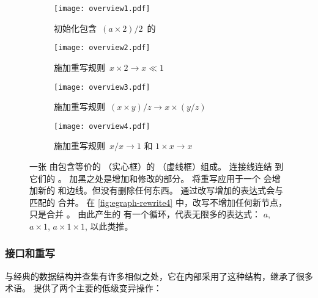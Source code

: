 \begin{figure}
  \begin{subfigure}[t]{0.175\linewidth}
    \centering
    \texttt{[image: overview1.pdf]}
    \caption{初始化包含\, ${(a \times 2) / 2}$ \,的\, \egraph}
    \label{fig:egraph-rewrite1}
  \end{subfigure}
  \hfill
  \begin{subfigure}[t]{0.23\linewidth}
    \centering
    \texttt{[image: overview2.pdf]}
    \caption{
      施加重写规则\, ${x \times 2 \to x \ll 1}$
    }
    \label{fig:egraph-rewrite2}
  \end{subfigure}
  \hfill
  \begin{subfigure}[t]{0.23\linewidth}
    \centering
    \texttt{[image: overview3.pdf]}
    \caption{
      施加重写规则\, ${(x \times y) / z \to x \times (y / z)}$
    }
    \label{fig:egraph-rewrite3}
  \end{subfigure}
  \hfill
  \begin{subfigure}[t]{0.24\linewidth}
    \centering
    \texttt{[image: overview4.pdf]}
    \caption{
      施加重写规则\, ${x / x \to 1}$ 和 ${1 \times x \to x}$
    }
    \label{fig:egraph-rewrite4}
  \end{subfigure}
  \caption{
    一张 \egraph 由包含等价的 \enodes（实心框）的 \eclasses （虚线框）组成。
    连接线连结 \enodes 到它们的 \eclasses 。
    加黑之处是增加和修改的部分。
    将重写应用于一个 \egraph 会增加新的 \enodes 和边线。但没有删除任何东西。
    通过改写增加的表达式会与匹配的 \eclass 合并。
    在 \autoref{fig:egraph-rewrite4} 中，改写不增加任何新节点，只是合并 \eclass。
      由此产生的 \egraph 有一个循环，代表无限多的表达式：
      $a$, $a \times 1$, $a \times 1 \times 1$, 以此类推。
  }
  \label{fig:egraph-rewrite}
\end{figure}


\subsubsection{接口和重写}
\label{sec:interface}

\Egraphs 与经典的数据结构并查集有许多相似之处，它在内部采用了这种结构，继承了很多术语。
\Egraphs 提供了两个主要的低级变异操作：

